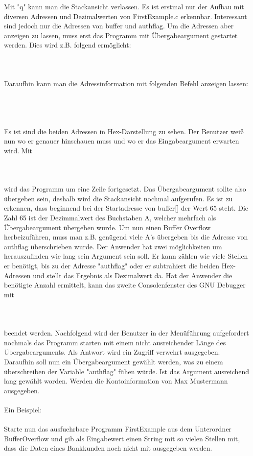 Mit "q" kann man die Stackansicht verlassen. Es ist erstmal nur der Aufbau mit diversen Adressen und Dezimalwerten von FirstExample.c erkennbar. Interessant sind jedoch nur die Adressen von buffer und authflag. Um die Adressen aber anzeigen zu lassen, muss erst das Programm mit Übergabeargument gestartet werden. Dies wird z.B. folgend ermöglicht:\\\\\\\\Daraufhin kann man die Adressinformation mit folgenden Befehl anzeigen lassen:\\\\ \\ \\\\Es ist sind die beiden Adressen in Hex-Darstellung zu sehen. Der Benutzer weiß nun wo er genauer hinschauen muss und wo er das Eingabeargument erwarten wird. Mit\\\\ \\\\wird das Programm um eine Zeile fortgesetzt. Das Übergabeargument sollte also übergeben sein, deshalb wird die Stackansicht nochmal aufgerufen. Es ist zu erkennen, dass beginnend bei der Startadresse von buffer[] der Wert 65 steht. Die Zahl 65 ist der Dezimmalwert des Buchstaben A, welcher mehrfach als Übergabeargument übergeben wurde. Um nun einen Buffer Overflow herbeizuführen, muss man z.B. genügend viele A's übergeben bis die Adresse von authflag überschrieben wurde. Der Anwender hat zwei möglichkeiten um herauszufinden wie lang sein Argument sein soll. Er kann zählen wie viele Stellen er benötigt, bis zu der Adresse "authflag" oder er subtrahiert die beiden Hex-Adressen und stellt das Ergebnis als Dezimalwert da. Hat der Anwender die benötigte Anzahl ermittelt, kann das zweite Consolenfenster des GNU Debugger mit\\\\ \\\\beendet werden. Nachfolgend wird der Benutzer in der Menüführung aufgefordert nochmals das Programm starten mit einem nicht ausreichender Länge des Übergabearguments. Als Antwort wird ein Zugriff verwehrt ausgegeben. Daraufhin soll nun ein Übergabeargument gewählt werden, was zu einem überschreiben der Variable "authflag" fühen würde. Ist das Argument ausreichend lang gewählt worden. Werden die Kontoinformation von Max Mustermann ausgegeben.\\\\Ein Beispiel:\\\\Starte nun das ausfuehrbare Programm FirstExample aus dem Unterordner BufferOverflow und gib als Eingabewert einen String mit so vielen Stellen mit, dass die Daten eines Bankkunden noch nicht mit ausgegeben werden.\\\\
